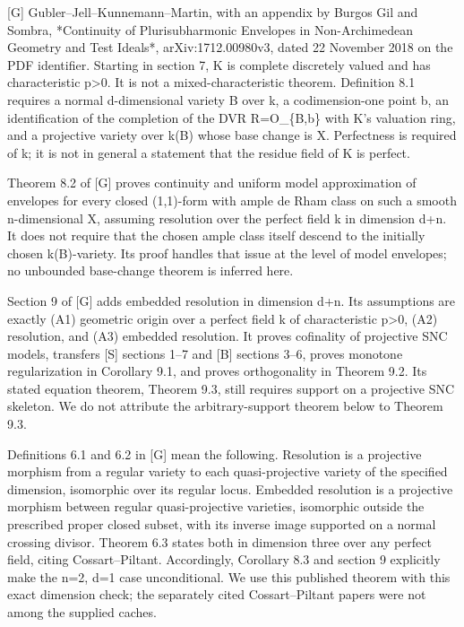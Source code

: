 \documentclass[11pt]{article}
\begin{document}
[G] Gubler--Jell--Kunnemann--Martin, with an appendix by Burgos Gil and Sombra, *Continuity of Plurisubharmonic Envelopes in Non-Archimedean Geometry and Test Ideals*, arXiv:1712.00980v3, dated 22 November 2018 on the PDF identifier. Starting in section 7, K is complete discretely valued and has characteristic p\textgreater{}0. It is not a mixed-characteristic theorem. Definition 8.1 requires a normal d-dimensional variety B over k, a codimension-one point b, an identification of the completion of the DVR R=O\_\{B,b\} with K's valuation ring, and a projective variety over k(B) whose base change is X. Perfectness is required of k; it is not in general a statement that the residue field of K is perfect.

Theorem 8.2 of [G] proves continuity and uniform model approximation of envelopes for every closed (1,1)-form with ample de Rham class on such a smooth n-dimensional X, assuming resolution over the perfect field k in dimension d+n. It does not require that the chosen ample class itself descend to the initially chosen k(B)-variety. Its proof handles that issue at the level of model envelopes; no unbounded base-change theorem is inferred here.

Section 9 of [G] adds embedded resolution in dimension d+n. Its assumptions are exactly (A1) geometric origin over a perfect field k of characteristic p\textgreater{}0, (A2) resolution, and (A3) embedded resolution. It proves cofinality of projective SNC models, transfers [S] sections 1--7 and [B] sections 3--6, proves monotone regularization in Corollary 9.1, and proves orthogonality in Theorem 9.2. Its stated equation theorem, Theorem 9.3, still requires support on a projective SNC skeleton. We do not attribute the arbitrary-support theorem below to Theorem 9.3.

Definitions 6.1 and 6.2 in [G] mean the following. Resolution is a projective morphism from a regular variety to each quasi-projective variety of the specified dimension, isomorphic over its regular locus. Embedded resolution is a projective morphism between regular quasi-projective varieties, isomorphic outside the prescribed proper closed subset, with its inverse image supported on a normal crossing divisor. Theorem 6.3 states both in dimension three over any perfect field, citing Cossart--Piltant. Accordingly, Corollary 8.3 and section 9 explicitly make the n=2, d=1 case unconditional. We use this published theorem with this exact dimension check; the separately cited Cossart--Piltant papers were not among the supplied caches.
\end{document}
